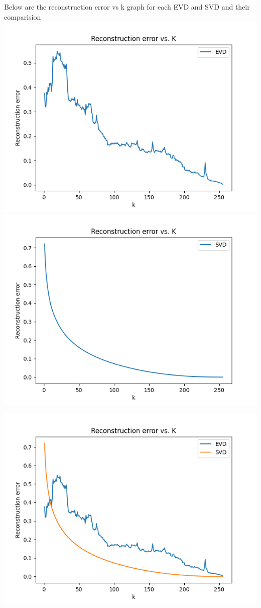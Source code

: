 \documentclass[12pt]{article}
\begin{document}
\begin{enumerate}
		Below are the reconstruction error vs k graph for each EVD and SVD and their comparision\\
		\includegraphics[scale= 0.5]{evd}
		\includegraphics[scale= 0.5]{svd}
		\begin{center}
			\includegraphics[scale= 0.5]{both}

\end{center}
\end{enumerate}
\end{document}

